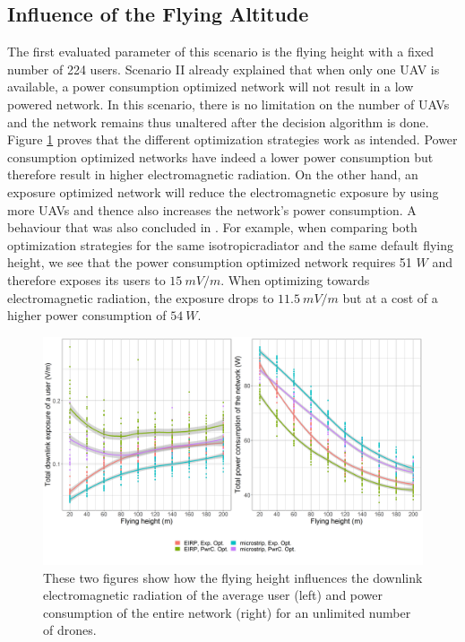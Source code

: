 \subsection{Influence of the Flying Altitude}
\label{S3A}
The first evaluated parameter of this scenario is the flying height
with a fixed number of 224 users.
Scenario II already explained that when only one \gls{UAV} is available, a power consumption optimized network will not result in a low 
powered network. In this scenario, there is no limitation on the number of \gls{UAV}s and the network remains thus unaltered after the decision 
algorithm is done. Figure \ref{fig:s3a_dlAndPc} proves that the different optimization strategies work as intended.
Power consumption optimized networks have indeed a lower power consumption but therefore result in higher electromagnetic radiation.
On the other hand, an exposure optimized network will reduce the electromagnetic exposure by using more \gls{UAV}s and thence also increases the network's power consumption.
A behaviour that was also concluded in \cite{J1}.
For example, when comparing both optimization strategies for the same \gls{isotropicradiator} and the same default flying height, we see that
the power consumption optimized network requires 51 $W$ and therefore exposes its users
to $15\ mV/m$. When optimizing towards electromagnetic radiation, the exposure drops to $11.5\ mV/m$ but at a cost of a higher power consumption
of $54\ W$.
\begin{figure}[h!]
\centering
  \includegraphics[width=\textwidth]{../results/s3/fhvsdlAndPc.png}
  \caption{
    These two figures show how the flying height influences the downlink electromagnetic radiation of the average user (left) and 
  power consumption of the entire network (right) for an unlimited number of drones.
  }
     \label{fig:s3a_dlAndPc}
\end{figure}

